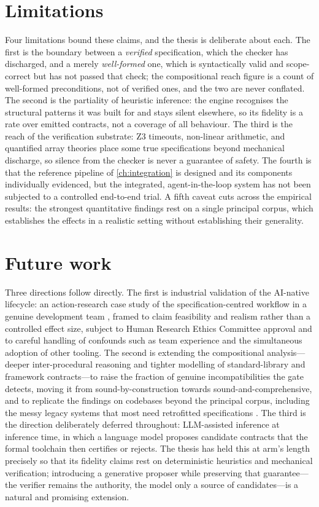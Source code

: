 \section{Limitations}\label{sec:conc-limitations}

Four limitations bound these claims, and the thesis is deliberate about each. The
first is the boundary between a \emph{verified} specification, which the checker
has discharged, and a merely \emph{well-formed} one, which is syntactically valid
and scope-correct but has not passed that check; the compositional reach figure is
a count of well-formed preconditions, not of verified ones, and the two are never
conflated. The second is the partiality of heuristic inference: the engine
recognises the structural patterns it was built for and stays silent elsewhere, so
its fidelity is a rate over emitted contracts, not a coverage of all behaviour.
The third is the reach of the verification substrate: Z3 timeouts, non-linear
arithmetic, and quantified array theories place some true specifications beyond
mechanical discharge, so silence from the checker is never a guarantee of safety.
The fourth is that the reference pipeline of \cref{ch:integration} is designed and
its components individually evidenced, but the integrated, agent-in-the-loop system
has not been subjected to a controlled end-to-end trial. A fifth caveat cuts
across the empirical results: the strongest quantitative findings rest on a single
principal corpus, which establishes the effects in a realistic setting without
establishing their generality.

\section{Future work}\label{sec:conc-future}

Three directions follow directly. The first is industrial validation of the
AI-native lifecycle: an action-research case study of the specification-centred
workflow in a genuine development team \citep{runeson2009casestudy,yin2018case},
framed to claim feasibility and realism rather than a controlled effect size,
subject to Human Research Ethics Committee approval and to careful handling of
confounds such as team experience and the simultaneous adoption of other tooling.
The second is extending the compositional analysis---deeper inter-procedural
reasoning and tighter modelling of standard-library and framework contracts---to
raise the fraction of genuine incompatibilities the gate detects, moving it from
sound-by-construction towards sound-and-comprehensive, and to replicate the
findings on codebases beyond the principal corpus, including the messy legacy
systems that most need retrofitted specifications \citep{feathers2004legacy}. The
third is the direction deliberately deferred throughout: LLM-assisted inference at
inference time, in which a language model proposes candidate contracts that the
formal toolchain then certifies or rejects. The thesis has held this at arm's
length precisely so that its fidelity claims rest on deterministic heuristics and
mechanical verification; introducing a generative proposer while preserving that
guarantee---the verifier remains the authority, the model only a source of
candidates---is a natural and promising extension.

